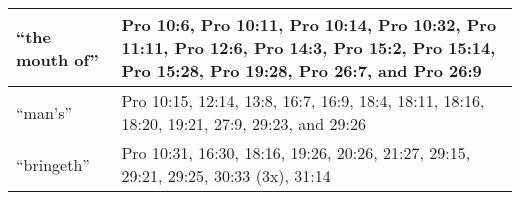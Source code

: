 \begin{center}
\begin{longtable}{l|p{3.75in}}
``the mouth of'' & Pro 10:6, Pro 10:11, Pro 10:14, Pro 10:32,  Pro 11:11, Pro 12:6, Pro 14:3, Pro 15:2, Pro 15:14, Pro 15:28, Pro 19:28, Pro 26:7, and Pro 26:9
 \\ \hline

``man's'' & Pro 10:15, 12:14, 13:8, 16:7, 16:9, 18:4, 18:11, 18:16, 18:20, 19:21, 27:9, 29:23, and 29:26 \\ \hline

``bringeth'' & Pro 10:31, 16:30, 18:16, 19:26, 20:26, 21:27, 29:15, 29:21, 29:25, 30:33 (3x), 31:14 
 \\ \hline

\end{longtable}
\end{center}